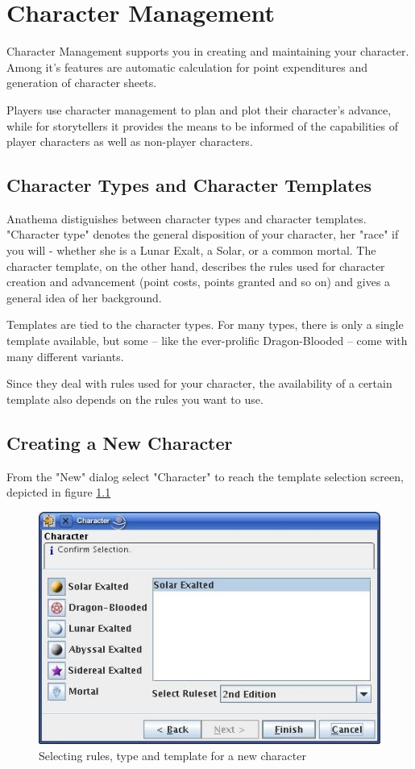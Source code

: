 \chapter{Character Management}

Character Management supports you in creating and maintaining your character. Among it's features are automatic calculation for point expenditures and generation of character sheets. 

Players use character management to plan and plot their character's advance, while for storytellers it provides the means to be informed of the capabilities of player characters as well as non-player characters.

\section{Character Types and Character Templates}
Anathema distiguishes between character types and character templates. "Character type" denotes the general disposition of your character, her "race" if you will - whether she is a Lunar Exalt, a Solar, or a common mortal. The character template, on the other hand, describes the rules used for character creation and advancement (point costs, points granted and so on) and gives a general idea of her background.

Templates are tied to the character types. For many types, there is only a single template available, but some -- like the ever-prolific Dragon-Blooded -- come with many different variants.

Since they deal with rules used for your character, the availability of a certain template also depends on the rules you want to use.

\section{Creating a New Character}
From the "New" dialog select "Character" to reach the template selection screen, depicted in figure \ref{fig:TemplateSelection}

\begin{figure}
	\centering
		\includegraphics[width=1.00\textwidth]{images/TemplateSelection.png}
	\caption{Selecting rules, type and template for a new character}
	\label{fig:TemplateSelection}
\end{figure}

